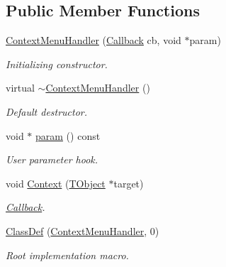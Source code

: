 \subsection*{Public Member Functions}
\begin{DoxyCompactItemize}
\item 
\hyperlink{class_d_d4hep_1_1_context_menu_handler_a55e7ee588a28189cb0766e1399d6b0c0}{ContextMenuHandler} (\hyperlink{class_d_d4hep_1_1_callback}{Callback} cb, void $\ast$param)
\begin{DoxyCompactList}\small\item\em Initializing constructor. \item\end{DoxyCompactList}\item 
virtual \hyperlink{class_d_d4hep_1_1_context_menu_handler_aa44899588abd2731d4e38a6a80bd8443}{$\sim$ContextMenuHandler} ()
\begin{DoxyCompactList}\small\item\em Default destructor. \item\end{DoxyCompactList}\item 
void $\ast$ \hyperlink{class_d_d4hep_1_1_context_menu_handler_ac34675679b67f4aa59066f09854d5ce4}{param} () const 
\begin{DoxyCompactList}\small\item\em User parameter hook. \item\end{DoxyCompactList}\item 
void \hyperlink{class_d_d4hep_1_1_context_menu_handler_a1e8043084d74ec968d010d6d7452f56b}{Context} (\hyperlink{class_t_object}{TObject} $\ast$target)
\begin{DoxyCompactList}\small\item\em \hyperlink{class_d_d4hep_1_1_callback}{Callback}. \item\end{DoxyCompactList}\item 
\hyperlink{class_d_d4hep_1_1_context_menu_handler_a1464908be325d3eef9a71cffa57d0968}{ClassDef} (\hyperlink{class_d_d4hep_1_1_context_menu_handler}{ContextMenuHandler}, 0)
\begin{DoxyCompactList}\small\item\em Root implementation macro. \item\end{DoxyCompactList}\end{DoxyCompactItemize}
